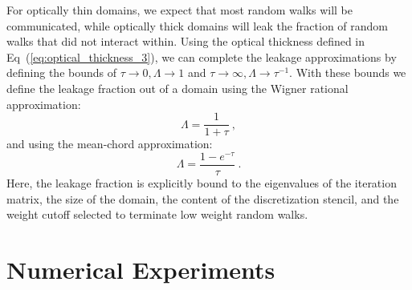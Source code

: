 \documentclass[preprint,11pt]{elsarticle}
\begin{document}
For optically thin domains, we expect that most random walks will be
communicated, while optically thick domains will leak the fraction of random
walks that did not interact within. Using the optical thickness defined in
Eq~(\ref{eq:optical_thickness_3}), we can complete the leakage approximations
by defining the bounds of $\tau \rightarrow 0, \Lambda \rightarrow 1$ and
$\tau \rightarrow \infty, \Lambda \rightarrow \tau^{-1}$.  With these bounds
we define the leakage fraction out of a domain using the Wigner rational
approximation:
\begin{equation}
  \Lambda = \frac{1}{1+\tau}\:,
  \label{eq:wigner_domain_leakage}
\end{equation}
and using the mean-chord approximation:
\begin{equation}
  \Lambda = \frac{1-e^{-\tau}}{\tau}\:.
  \label{eq:mean_chord_domain_leakage}
\end{equation}
Here, the leakage fraction is explicitly bound to the eigenvalues of
the iteration matrix, the size of the domain, the content of the
discretization stencil, and the weight cutoff selected to terminate
low weight random walks.

\section{Numerical Experiments}
\label{sec:numerical_experiments}
\end{document}
